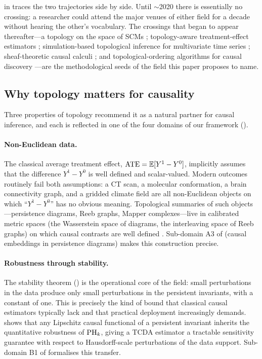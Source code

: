  in  traces the two
trajectories side by side. Until $\sim$2020 there is essentially no
crossing: a researcher could attend the major venues of either field
for a decade without hearing the other's vocabulary. The crossings
that began to appear thereafter---a topology on the space of SCMs
\citep{ibeling2021topological}; topology-aware treatment-effect
estimators \citep{kim2026topological}; simulation-based topological
inference for multivariate time series
\citep{elyaagoubi2023statistical}; sheaf-theoretic causal calculi
\citep{mahadevan2021causal,mahadevan2022universal,mahadevan2025sheaf};
and topological-ordering algorithms for causal discovery
\citep{rolland2022score,tran2024constraining,xu2025information,
nocurl2024,wu2026optimization}---are the methodological seeds of the
field this paper proposes to name.

\subsection{Why topology matters for causality}\label{sec:intro_why}

Three properties of topology recommend it as a natural partner for
causal inference, and each is reflected in one of the four domains of
our framework ().

\paragraph{Non-Euclidean data.}
The classical average treatment effect, $\operatorname{ATE} = \mathbb{E}[Y^1 - Y^0]$,
implicitly assumes that the difference $Y^1 - Y^0$ is well defined and
scalar-valued. Modern outcomes routinely fail both assumptions: a CT
scan, a molecular conformation, a brain connectivity graph, and a
gridded climate field are all non-Euclidean objects on which
``$Y^1 - Y^0$'' has no obvious meaning. Topological summaries of such
objects---persistence diagrams, Reeb graphs, Mapper complexes---live
in calibrated metric spaces (the Wasserstein space of diagrams, the
interleaving space of Reeb graphs) on which causal contrasts are
well defined \citep{kim2026topological,kurisu2024geodesic}. Sub-domain
A3 of  (causal embeddings in persistence diagrams)
makes this construction precise.

\paragraph{Robustness through stability.}
The stability theorem () is the operational core of
the field: small perturbations in the data produce only small
perturbations in the persistent invariants, with a constant of one.
This is precisely the kind of bound that classical causal estimators
typically lack and that practical deployment increasingly demands.
 shows that any Lipschitz causal
functional of a persistent invariant inherits the quantitative
robustness of $\mathrm{PH}_{k}$, giving a TCDA estimator a tractable
sensitivity guarantee with respect to Hausdorff-scale perturbations
of the data support. Sub-domain B1 of  formalises
this transfer.

